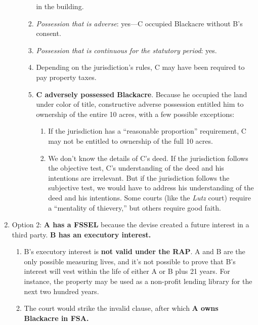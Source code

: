 \begin{enumerate}
\begin{enumerate}
\begin{enumerate}
            in the building.
            \item \emph{Possession that is adverse}: yes---C occupied 
            Blackacre without B's consent.
            \item \emph{Possession that is continuous for the statutory 
            period}: yes.
            \item Depending on the jurisdiction's rules, C may have been 
            required to pay property taxes.
            \item \textbf{C adversely possessed Blackacre}. Because he 
            occupied the land under color of title, constructive adverse 
            possession entitled him to ownership of the entire 10 acres, with 
            a few possible exceptions:
            \begin{enumerate}
                \item If the jurisdiction has a ``reasonable proportion'' 
                requirement, C may not be entitled to ownership of the full 10 
                acres.
                \item We don't know the details of C's deed. If the 
                jurisdiction follows the objective test, C's understanding of 
                the deed and his intentions are irrelevant. But if the 
                jurisdiction follows the subjective test, we would have to 
                address his understanding of the deed and his intentions. Some 
                courts (like the \emph{Lutz} court) require a ``mentality of 
                thievery,'' but others require good faith.
            \end{enumerate}
        \end{enumerate}
    \end{enumerate}
    \item Option 2: \textbf{A has a FSSEL} because the devise created a 
    future interest in a third party. \textbf{B has an executory interest.}
    \begin{enumerate}
        \item B's executory interest is \textbf{not valid under the RAP}. A 
        and B are the only possible measuring lives, and it's not possible to 
        prove that B's interest will vest within the life of either A or B 
        plus 21 years. For instance, the property may be used as a non-profit 
        lending library for the next two hundred years.
        \item The court would strike the invalid clause, after which \textbf{A 
        owns Blackacre in FSA.}

\end{enumerate}
\end{enumerate}
